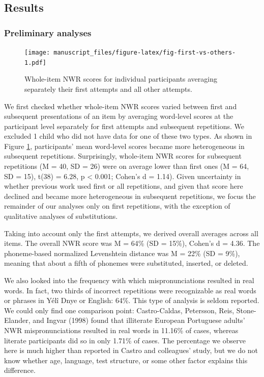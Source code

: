 \documentclass[english,,man,floatsintext]{apa6}
\begin{document}
\hypertarget{results}{%
\subsection{Results}\label{results}}

\hypertarget{preliminary-analyses}{%
\subsubsection{Preliminary analyses}\label{preliminary-analyses}}

\begin{figure}
\centering
\texttt{[image: manuscript\_files/figure-latex/fig-first-vs-others-1.pdf]}
\caption{\label{fig:fig-first-vs-others}Whole-item NWR scores for individual participants averaging separately their first attempts and all other attempts.}
\end{figure}

We first checked whether whole-item NWR scores varied between first and subsequent presentations of an item by averaging word-level scores at the participant level separately for first attempts and subsequent repetitions. We excluded 1 child who did not have data for one of these two types. As shown in Figure \ref{fig:fig-first-vs-others}, participants' mean word-level scores became more heterogeneous in subsequent repetitions. Surprisingly, whole-item NWR scores for subsequent repetitions (M = 40, SD = 26)
were on average lower than first ones (M = 64, SD = 15), t(38) = 6.28, p \textless{} 0.001; Cohen's d = 1.14). Given uncertainty in whether previous work used first or all repetitions, and given that score here declined and became more heterogeneous in subsequent repetitions, we focus the remainder of our analyses only on first repetitions, with the exception of qualitative analyses of substitutions.

Taking into account only the first attempts, we derived overall averages across all items. The overall NWR score was M = 64\% (SD = 15\%), Cohen's d = 4.36. The phoneme-based normalized Levenshtein distance was M = 22\% (SD = 9\%), meaning that about a fifth of phonemes were substituted, inserted, or deleted.

We also looked into the frequency with which mispronunciations resulted in real words. In fact, two thirds of incorrect repetitions were recognizable as real words or phrases in Yélî Dnye or English: 64\%. This type of analysis is seldom reported. We could only find one comparison point: Castro-Caldas, Petersson, Reis, Stone-Elander, and Ingvar (1998) found that illiterate European Portuguese adults' NWR mispronunciations resulted in real words in 11.16\% of cases, whereas literate participants did so in only 1.71\% of cases. The percentage we observe here is much higher than reported in Castro and colleagues' study, but we do not know whether age, language, test structure, or some other factor explains this difference.
\end{document}
